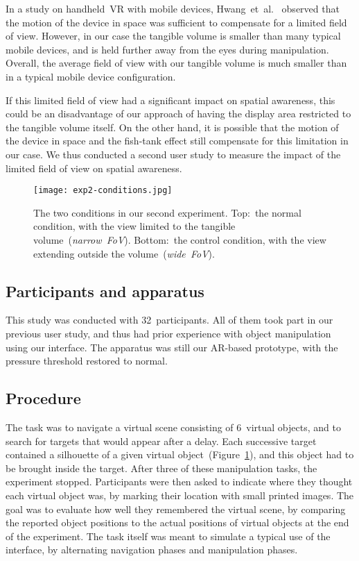 \documentclass{vgtc}                         \havecopyrightspacefalse
\begin{document}
In a study on handheld~VR with mobile devices, Hwang~et~al.~\cite{hwang06} observed that the motion of the device in space was sufficient to compensate for a limited field of view. However, in our case the tangible volume is smaller than many typical mobile devices, and is held further away from the eyes during manipulation. Overall, the average field of view with our tangible volume is much smaller than in a typical mobile device configuration.

If this limited field of view had a significant impact on spatial awareness, this could be an disadvantage of our approach of having the display area restricted to the tangible volume itself. On the other hand, it is possible that the motion of the device in space and the fish-tank effect still compensate for this limitation in our case. We thus conducted a second user study to measure the impact of the limited field of view on spatial awareness.

\begin{figure}[t!]
  \centering
  \texttt{[image: exp2-conditions.jpg]}
  \caption{The two conditions in our second experiment. Top:~the normal condition, with the view limited to the tangible volume~(\emph{narrow~FoV}). Bottom:~the control condition, with the view extending outside the volume~(\emph{wide~FoV}).}
  \label{fig:results2-photo}
\end{figure}

\subsection{Participants and apparatus}

This study was conducted with 32~participants. All of them took part in our previous user study, and thus had prior experience with object manipulation using our interface. The apparatus was still our AR-based prototype, with the pressure threshold restored to normal.

\subsection{Procedure}

The task was to navigate a virtual scene consisting of 6~virtual objects, and to search for targets that would appear after a delay. Each successive target contained a silhouette of a given virtual object~(Figure~\ref{fig:results2-photo}), and this object had to be brought inside the target. After three of these manipulation tasks, the experiment stopped. Participants were then asked to indicate where they thought each virtual object was, by marking their location with small printed images. The goal was to evaluate how well they remembered the virtual scene, by comparing the reported object positions to the actual positions of virtual objects at the end of the experiment. The task itself was meant to simulate a typical use of the interface, by alternating navigation phases and manipulation phases.
\end{document}
